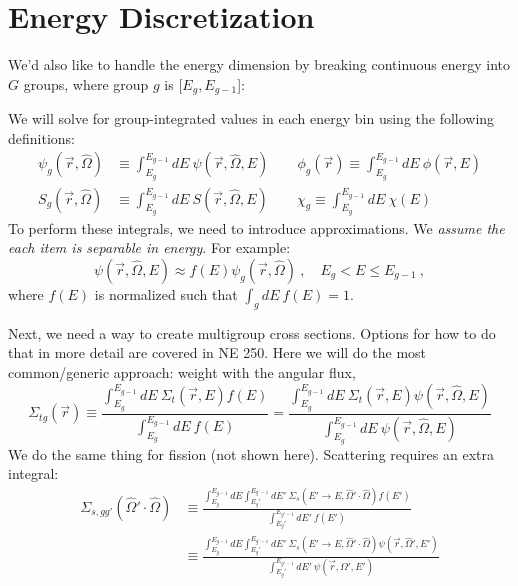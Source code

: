 \documentclass[12pt]{article}
\newcommand{\rvec}{\ensuremath{\vec{r}}}
\newcommand{\vOmega}{\ensuremath{\hat{\Omega}}}
\begin{document}
\section*{Energy Discretization}
We'd also like to handle the energy dimension by breaking continuous energy into $G$ groups, where group $g$ is [$E_{g}, E_{g-1}$]:
\begin{center}
\end{center}
%
We will solve for group-integrated values in each energy bin using the following definitions:
\begin{align*}
\psi_g(\rvec, \vOmega) &\equiv \int_{E_g}^{E_{g-1}} dE\: \psi(\rvec, \vOmega, E) \qquad
\phi_g(\rvec) \equiv \int_{E_g}^{E_{g-1}} dE\: \phi(\rvec,  E)\\
S_g(\rvec, \vOmega) &\equiv \int_{E_g}^{E_{g-1}} dE\: S(\rvec, \vOmega, E) \qquad
\chi_g \equiv \int_{E_g}^{E_{g-1}} dE\: \chi(E)
\end{align*}
%
To perform these integrals, we need to introduce approximations. We \textit{assume the each item is separable in energy}. For example:
\[
\psi(\vec{r}, \vOmega, E) \approx f(E)\psi_g(\vec{r}, \vOmega)\:, \quad E_g < E \leq E_{g-1}\:,
\]
where $f(E)$ is normalized such that $\int_g dE\: f(E) = 1$.

Next, we need a way to create multigroup cross sections. Options for how to do that in more detail are covered in NE 250. Here we will do the most common/generic approach: weight with the angular flux,
\[\Sigma_{tg}(\vec{r}) \equiv \frac{\int_{E_g}^{E_{g-1}} dE\: \Sigma_t(\rvec, E) f(E)}{\int_{E_g}^{E_{g-1}} dE\: f(E)} = \frac{\int_{E_g}^{E_{g-1}} dE\: \Sigma_t(\rvec, E) \psi(\rvec, \vOmega, E)}{\int_{E_g}^{E_{g-1}} dE\: \psi(\rvec, \vOmega, E)}\]
We do the same thing for fission (not shown here). Scattering requires an extra integral:
\begin{align*}
\Sigma_{s,gg'}(\vOmega' \cdot \vOmega) & \equiv \frac{\int_{E_g}^{E_{g-1}} dE \int_{E_g'}^{E_{g'-1}} dE' \: \Sigma_s(E'\rightarrow E, \vOmega' \cdot \vOmega) f(E')}{\int_{E_g'}^{E_{g'-1}} dE' \: f(E')}\\
& \equiv \frac{\int_{E_g}^{E_{g-1}} dE \int_{E_g'}^{E_{g'-1}} dE' \: \Sigma_s(E'\rightarrow E, \vOmega' \cdot \vOmega) \psi(\rvec, \vOmega', E')}{\int_{E_g'}^{E_{g'-1}} dE' \: \psi(\rvec, \vOmega', E')}
\end{align*}
\end{document}
